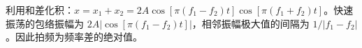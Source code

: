 利用和差化积：$x=x_1+x_2=2A\cos[\pi(f_1-f_2)t]\cos[\pi(f_1+f_2)t]$。快速振荡的包络振幅为 $2A|\cos[\pi(f_1-f_2)t]|$，相邻振幅极大值的间隔为 $1/|f_1-f_2|$。因此拍频为频率差的绝对值。
